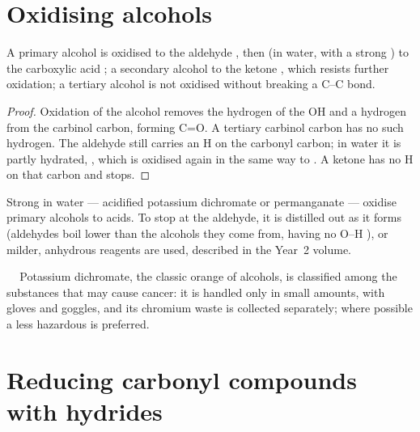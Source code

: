\section{Oxidising alcohols}

\begin{proposition}\label{prop:b1:organic-redox:alcohol-oxidation}
A primary alcohol  is oxidised to the aldehyde , then
(in water, with a strong ) to the carboxylic acid ; a
secondary alcohol  to the ketone , which resists
further oxidation; a tertiary alcohol  is not oxidised without
breaking a C--C bond.
\end{proposition}

\begin{proof}
Oxidation of the alcohol removes the hydrogen of the OH and a hydrogen
from the carbinol carbon, forming C=O. A tertiary carbinol carbon has no
such hydrogen. The aldehyde still carries an H on the carbonyl carbon; in
water it is partly hydrated, , which is oxidised again in the
same way to . A ketone has no H on that carbon and stops.
\end{proof}

Strong  in water --- acidified potassium dichromate or
permanganate --- oxidise primary alcohols to acids. To stop at the
aldehyde, it is distilled out as it forms (aldehydes boil lower than the
alcohols they come from, having no O--H ), or milder,
anhydrous reagents are used, described in the Year~2 volume.

\begin{safety}{\,\,\,\,\,}
Potassium dichromate, the classic orange  of alcohols, is
classified among the substances that may cause cancer: it is handled only
in small amounts, with gloves and goggles, and its chromium waste is
collected separately; where possible a less hazardous  is
preferred.
\end{safety}

\section{Reducing carbonyl compounds with hydrides}

